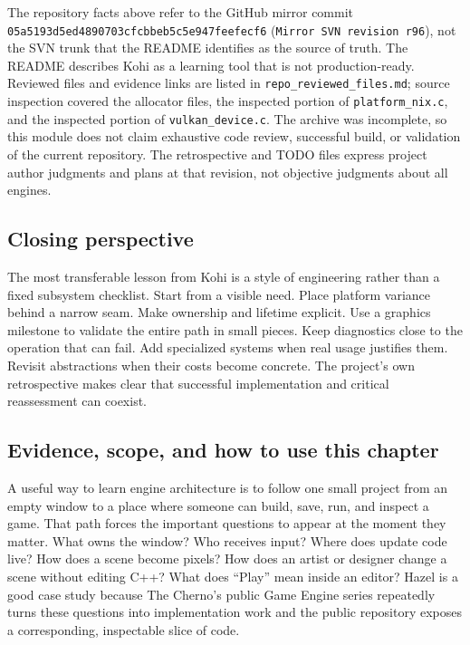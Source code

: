 The repository facts above refer to the GitHub mirror commit \texttt{05a5193d5ed4890703cfcbbeb5c5e947feefecf6} (\texttt{Mirror\ SVN\ revision\ r96}), not the SVN trunk that the README identifies as the source of truth. The README describes Kohi as a learning tool that is not production-ready. Reviewed files and evidence links are listed in \texttt{repo\_reviewed\_files.md}; source inspection covered the allocator files, the inspected portion of \texttt{platform\_nix.c}, and the inspected portion of \texttt{vulkan\_device.c}. The archive was incomplete, so this module does not claim exhaustive code review, successful build, or validation of the current repository. The retrospective and TODO files express project author judgments and plans at that revision, not objective judgments about all engines.

\subsection{Closing perspective}\label{06-engine-ii-ch042-closing-perspective}

The most transferable lesson from Kohi is a style of engineering rather than a fixed subsystem checklist. Start from a visible need. Place platform variance behind a narrow seam. Make ownership and lifetime explicit. Use a graphics milestone to validate the entire path in small pieces. Keep diagnostics close to the operation that can fail. Add specialized systems when real usage justifies them. Revisit abstractions when their costs become concrete. The project's own retrospective makes clear that successful implementation and critical reassessment can coexist.

\subsection{Evidence, scope, and how to use this chapter}\label{06-engine-ii-ch042-evidence-scope-and-how-to-use-this-chapter}

A useful way to learn engine architecture is to follow one small project from an empty window to a place where someone can build, save, run, and inspect a game. That path forces the important questions to appear at the moment they matter. What owns the window? Who receives input? Where does update code live? How does a scene become pixels? How does an artist or designer change a scene without editing C++? What does ``Play'' mean inside an editor? Hazel is a good case study because The Cherno's public Game Engine series repeatedly turns these questions into implementation work and the public repository exposes a corresponding, inspectable slice of code.

